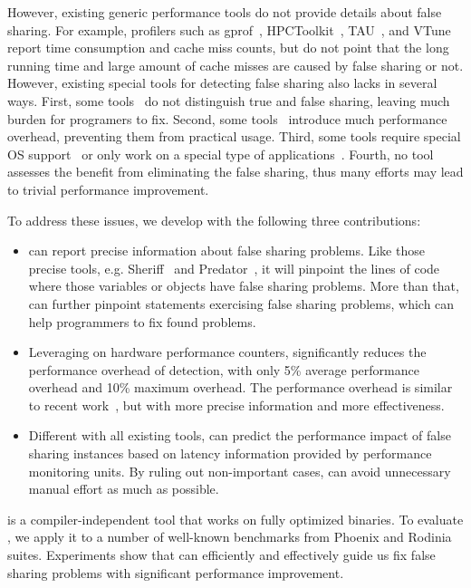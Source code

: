 However, existing generic performance tools do not provide details about false sharing. For example, profilers such as gprof~\cite{gprof}, HPCToolkit~\cite{}, TAU~\cite{}, and VTune~\cite{} report time consumption and cache miss counts, but do not point that the long running time and large amount of cache misses are caused by false sharing or not. However, existing special tools for detecting false sharing also lacks in several ways. First, some tools~\cite{falseshare:binaryinstrumentation1,detect:ptu,detect:intel,falseshare:binaryinstrumentation2,DProf, qinzhao, OSdetection, mldetect, Wicaksono11detectingfalse, openmp} do not distinguish true and false sharing, leaving much burden for programers to fix. Second, some tools~\cite{falseshare:binaryinstrumentation1,falseshare:binaryinstrumentation2,falseshare:simulator, Predator} introduce much performance overhead, preventing them from practical usage. Third, some tools require special OS support~\cite{OSdetection} or only work on a special type of applications~\cite{sheriff}. Fourth, no tool assesses the benefit from eliminating the false sharing, thus many efforts may lead to trivial performance improvement.

\vspace{0.2in}

To address these issues, we develop \cheetah{} with the following three contributions:
\begin{itemize} 
\item \cheetah{} can report precise information about false sharing problems. Like those precise tools, e.g. Sheriff~\cite{sheriff} and Predator~\cite{Predator}, it will pinpoint the lines of code where those variables or objects have false sharing problems. More than that, \cheetah{} can further pinpoint statements exercising false sharing problems, which can help programmers to fix found problems. 

\sloppy
\item Leveraging on hardware performance counters, \cheetah{} significantly reduces the performance overhead of detection, with only 5\% average performance overhead and 10\% maximum overhead. The performance overhead is similar to recent work~\cite{mldetect, openmp}, but with more precise information and more effectiveness.
  
\item Different with all existing tools, \Cheetah{} can predict the performance impact of false sharing instances based on latency information provided by performance monitoring units. By ruling out non-important cases, \Cheetah{} can avoid unnecessary manual effort as much as possible. 
\end{itemize}
\cheetah{} is a compiler-independent tool that works on fully optimized binaries. To evaluate \cheetah{}, we apply it to a number of well-known benchmarks from Phoenix and Rodinia suites. Experiments show that \cheetah{} can efficiently and effectively guide us fix false sharing problems with significant performance improvement.

